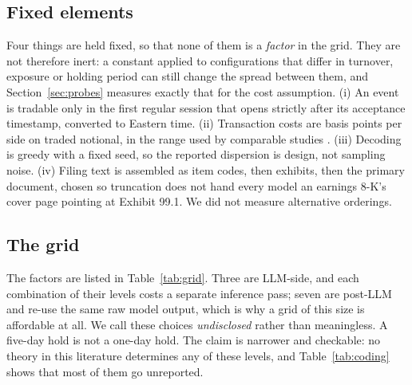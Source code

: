 \documentclass[sigconf]{acmart}
\begin{document}
\subsection{Fixed elements}

Four things are held fixed, so that none of them is a \emph{factor} in the grid. They are not
therefore inert: a constant applied to configurations that differ in turnover, exposure or holding
period can still change the spread between them, and Section~\ref{sec:probes} measures exactly that
for the cost assumption. (i) An event is tradable only in the first regular session that opens
strictly after its acceptance timestamp, converted to Eastern time. (ii) Transaction costs are
\CostBps{} basis points per side on traded notional, in the range used by comparable studies
\cite{lopezlira2023chatgpt,huang2026hypotheses}. (iii) Decoding is greedy with a fixed seed, so the
reported dispersion is design, not sampling noise. (iv) Filing text is assembled as item codes,
then exhibits, then the primary document, chosen so truncation does not hand every model an earnings
8-K's cover page pointing at Exhibit 99.1. We did not measure alternative orderings.

\subsection{The grid}

The factors are listed in Table~\ref{tab:grid}. Three are LLM-side, and each combination of their
levels costs a separate inference pass; seven are post-LLM and re-use the same raw model output, which is why a grid of this size is
affordable at all. We call these choices \emph{undisclosed} rather than meaningless. A five-day hold
is not a one-day hold. The claim is narrower and checkable: no theory in this literature determines
any of these levels, and Table~\ref{tab:coding} shows that most of them go unreported.
\end{document}
